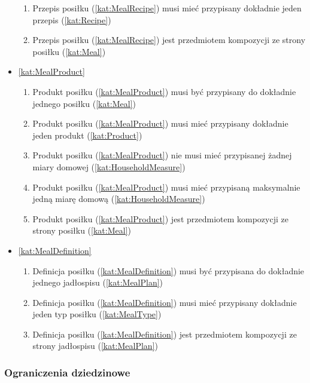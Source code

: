 \begin{itemize}[label={\textbf{Reguły dla}}, wide, labelwidth=!, labelindent=0pt]
\begin{enumerate}[label={\textbf{REG/4/\protect\twodigits{\arabic{enumi}}}}, wide, labelwidth=!, align=left, leftmargin=3cm, resume]
        \item Przepis posiłku (\ref{kat:MealRecipe}) musi mieć przypisany dokładnie jeden przepis (\ref{kat:Recipe})
        \item Przepis posiłku (\ref{kat:MealRecipe}) jest przedmiotem kompozycji ze strony posiłku (\ref{kat:Meal})
    \end{enumerate}
    \item\ref{kat:MealProduct}\mynobreakpar
    \begin{enumerate}[label={\textbf{REG/4/\protect\twodigits{\arabic{enumi}}}}, wide, labelwidth=!, align=left, leftmargin=3cm, resume]
        \item Produkt posiłku (\ref{kat:MealProduct}) musi być przypisany do dokładnie jednego posiłku (\ref{kat:Meal})
        \item Produkt posiłku (\ref{kat:MealProduct}) musi mieć przypisany dokładnie jeden produkt (\ref{kat:Product})
        \item Produkt posiłku (\ref{kat:MealProduct}) nie musi mieć przypisanej żadnej miary domowej (\ref{kat:HouseholdMeasure})
        \item Produkt posiłku (\ref{kat:MealProduct}) musi mieć przypisaną maksymalnie jedną miarę domową (\ref{kat:HouseholdMeasure})
        \item Produkt posiłku (\ref{kat:MealProduct}) jest przedmiotem kompozycji ze strony posiłku (\ref{kat:Meal})
    \end{enumerate}
    \item\ref{kat:MealDefinition}\mynobreakpar
    \begin{enumerate}[label={\textbf{REG/4/\protect\twodigits{\arabic{enumi}}}}, wide, labelwidth=!, align=left, leftmargin=3cm, resume]
        \item Definicja posiłku (\ref{kat:MealDefinition}) musi być przypisana do dokładnie jednego jadłospisu (\ref{kat:MealPlan})
        \item Definicja posiłku (\ref{kat:MealDefinition}) musi mieć przypisany dokładnie jeden typ posiłku (\ref{kat:MealType})
        \item Definicja posiłku (\ref{kat:MealDefinition}) jest przedmiotem kompozycji ze strony jadłospisu (\ref{kat:MealPlan})
    \end{enumerate}
\end{itemize}

\subsubsection{Ograniczenia dziedzinowe}\label{subsubsec:database:mealplans:restrictions}

